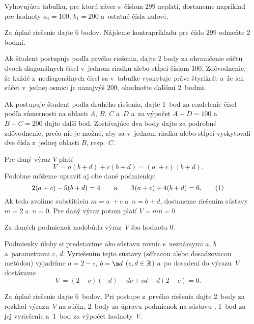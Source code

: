 {Vyhovujúcu tabuľku, pre ktorú záver s~číslom $299$ neplatí, dostaneme
napríklad pre hodnoty $a_1 = 100$, $b_1 = 200$ a~ostatné čísla nulové.


\nobreak\medskip\petit\noindent
Za úplné riešenie dajte 6 bodov.
Nájdenie kontrapríkladu pre číslo $299$ odmeňte 2 bodmi.

Ak študent postupuje podľa prvého riešenia, dajte 2 body za ohraničenie súčtu
dvoch diagonálnych čísel v~jednom riadku alebo stĺpci číslom $100$. Zdôvodnenie,
že každé z~nediagonálnych čísel sa
v~tabuľke vyskytuje práve štyrikrát a~že ich súčet v~jednej osmici je
nanajvýš $200$, ohodnoťte ďalšími 2~bodmi.

Ak postupuje študent podľa druhého riešenia, dajte 1~bod za rozdelenie čísel
podľa súmernosti na oblasti $A$, $B$, $C$ a~$D$ a~za výpočet
$A + D = 100$ a~$B + C = 200$ dajte ďalší bod. Zostávajúce dva body dajte za
podrobné zdôvodnenie, prečo nie je možné, aby sa v~jednom riadku alebo
stĺpci vyskytovali dve čísla z~jednej oblasti $B$, resp.~$C$.


\endpetit
\bigbreak}

{%
Pre daný výraz $V$ platí
$$
V~= a(b + d) + c(b + d ) = (a~+ c)(b + d ).
$$
Podobne môžeme upraviť aj obe dané podmienky:
$$
2(a + c) - 5(b + d ) = 4\qquad \text{a}\qquad 3(a + c) + 4(b + d ) = 6. \tag1
$$
Ak teda zvolíme substitúciu $m = a~+ c$ a~$n = b + d $, dostaneme riešením sústavy 
$m = 2$ a~$n = 0$.
Pre daný výraz potom platí $V = mn = 0$.

\zaver
Za daných podmienok nadobúda výraz~$V$ iba hodnotu $0$.

\ineriesenie
Podmienky úlohy si predstavíme ako sústavu
rovníc s~neznámymi $a$, $b$ a~parametrami $c$, $d$. Vyriešením tejto sústavy
(sčítacou alebo dosadzovacou metódou) vyjadríme
$a = 2 - c$, $b = \m d$ ($c, d\in\Bbb R$) a~po dosadení do výrazu~$V$ dostávame
$$
V~= (2 - c)(-d ) - dc + cd + d (2 - c) = 0.
$$

\nobreak\medskip\petit\noindent
Za úplné riešenie dajte 6~bodov. Pri postupe z~prvého riešenia dajte 2~body za rozklad výrazu~$V$ na súčin, 2~body za úpravu podmienok na sústavu , 1~bod za jej
vyriešenie a~1~bod za výpočet hodnoty~$V$.

\endpetit
\bigbreak
}

